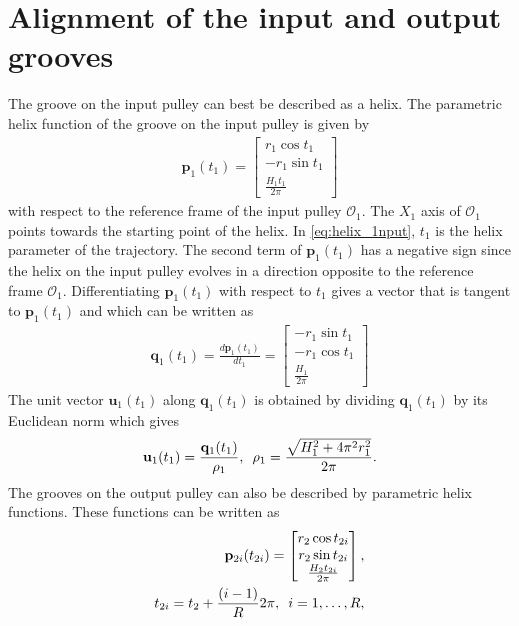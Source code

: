 \section{Alignment of the input and output grooves}
 The groove on the input pulley can best be described as a helix. The parametric helix function of the groove on the input pulley is given by 
 \begin{align}
     \mathbf{p}_1(t_1) = \begin{bmatrix}
     r_1\cos t_1\\-r_1\sin t_1\\\frac{H_1t_1}{2\pi}
     \end{bmatrix}
     \label{eq:helix_1nput}
 \end{align}
  with respect to the reference frame of the input pulley $\mathcal{O}_1$. The $X_1$ axis of $\mathcal{O}_1$ points towards the starting point of the helix. In \eqref{eq:helix_1nput},
 $t_1$ is the helix parameter of the trajectory. The second term of $\mathbf{p}_1(t_1)$ has a negative sign since the helix on the input pulley evolves in a direction opposite to the reference frame $\mathcal{O}_1$. Differentiating $\mathbf{p}_1(t_1)$ with respect to $t_1$ gives a vector that is tangent to $\mathbf{p}_1(t_1)$ and which can be written as
 \begin{align}
     \mathbf{q}_1(t_1) = \frac{d\mathbf{p}_1(t_1)}{dt_1} = \begin{bmatrix}
     -r_1\sin t_1\\-r_1\cos t_1\\\frac{H_1}{2\pi}
     \end{bmatrix} 
 \end{align}
 The unit vector $\mathbf{u}_1(t_1)$ along $\mathbf{q}_1(t_1)$ is obtained by dividing $\mathbf{q}_1(t_1)$ by its Euclidean norm which gives
 \begin{align}
     \mathbf{u}_1(t_1) = \frac{\mathbf{q}_1(t_1)}{\rho_1}, \hspace{0.5em} \rho_1 = \frac{\sqrt{H_1^2+4\pi^2r_1^2}}{2\pi}.
 \end{align}
  The grooves on the output pulley can also be described by parametric helix functions. These functions can be written as
  \begin{align}
      \mathbf{p}_{2i}(t_{2i}) = \begin{bmatrix}
      r_2\cos t_{2i}\\
      r_2\sin t_{2i}\\
      \frac{H_2 t_{2i}}{2\pi}
      \end{bmatrix},\\ t_{2i} = t_2+\frac{(i-1)}{R}2\pi, \hquad i =1 ,\ldots , R,
      \label{eq:output_helix}
  \end{align}
